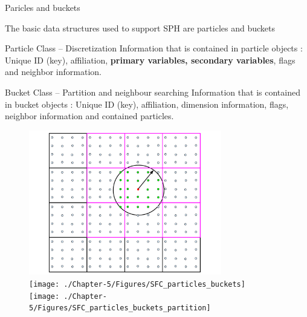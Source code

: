 \documentclass{beamer}
\begin{document}
\begin{frame}{Paricles and buckets}
\centering
\begin{minipage}{0.66\linewidth}
The basic data structures used to support SPH are particles and buckets %
\begin{block}{Particle Class  -- Discretization}
Information that is contained in particle objects :
Unique ID (key), affiliation, {\bf primary variables, secondary variables}, flags and neighbor information.
\end{block}
\begin{block}{Bucket Class -- Partition and neighbour searching}
Information that is contained in bucket objects :
Unique ID (key), affiliation, dimension information, flags, neighbor information and contained particles.
\end{block}
\end{minipage}
\begin{minipage}{0.33 \linewidth}
\begin{figure}
\flushright
\includegraphics[width=0.75\textwidth]{./PPT/Neighbor-Search}
\\
\flushright
\texttt{[image: ./Chapter-5/Figures/SFC\_particles\_buckets]}
\\
\flushright
\texttt{[image: ./Chapter-5/Figures/SFC\_particles\_buckets\_partition]}
\end{figure}
\end{minipage}
\end{frame}
\end{document}
